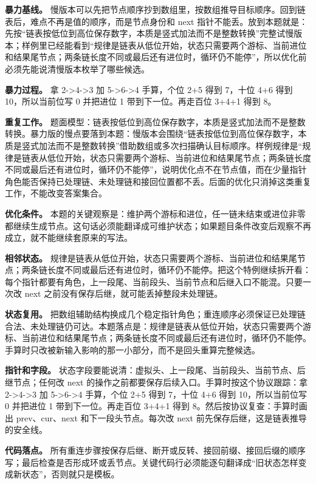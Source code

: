\textbf{暴力基线。} 慢版本可以先把节点顺序抄到数组里，按数组推导目标顺序。回到链表后，难点不再是值的顺序，而是节点身份和 next 指针不能丢。放到本题就是：先按“链表按低位到高位保存数字，本质是竖式加法而不是整数转换”完整试慢版本；样例里已经能看到“规律是链表从低位开始，状态只需要两个游标、当前进位和结果尾节点；两条链长度不同或最后还有进位时，循环仍不能停”，所以优化前必须先能说清慢版本枚举了哪些候选。

\textbf{暴力过程。} 拿 2->4->3 加 5->6->4 手算，个位 2+5 得到 7，十位 4+6 得到 10，所以当前位写 0 并把进位 1 带到下一位。再走百位 3+4+1 得到 8。

\textbf{重复工作。} 题面模型：链表按低位到高位保存数字，本质是竖式加法而不是整数转换。暴力版的慢点要落到本题：慢版本会围绕“链表按低位到高位保存数字，本质是竖式加法而不是整数转换”借助数组或多次扫描确认目标顺序。样例规律是“规律是链表从低位开始，状态只需要两个游标、当前进位和结果尾节点；两条链长度不同或最后还有进位时，循环仍不能停”，说明优化点不在节点值，而在少量指针角色能否保持已处理链、未处理链和接回位置都不丢。后面的优化只消掉这类重复工作，不能改变答案集合。

\textbf{优化条件。} 本题的关键观察是：维护两个游标和进位，任一链未结束或进位非零都继续生成节点。这句话必须能翻译成可维护状态；如果题目条件改变后观察不再成立，就不能继续套原来的写法。

\textbf{相邻状态。} 规律是链表从低位开始，状态只需要两个游标、当前进位和结果尾节点；两条链长度不同或最后还有进位时，循环仍不能停。把这个特例继续拆开看：每个指针都要有角色，上一段尾、当前段头、当前节点和后继入口不能混。只要一次改 next 之前没有保存后继，就可能丢掉整段未处理链。

\textbf{状态复用。} 把数组辅助结构换成几个稳定指针角色；重连顺序必须保证已处理链合法、未处理链仍可达。本题落点是：规律是链表从低位开始，状态只需要两个游标、当前进位和结果尾节点；两条链长度不同或最后还有进位时，循环仍不能停。手算时只改被新输入影响的那一小部分，而不是回头重算完整候选。

\textbf{指针和字段。} 状态字段要能说清：虚拟头、上一段尾、当前段头、当前节点、后继节点；任何改 next 的操作之前都要保存后续入口。手算时按这个协议跟踪：拿 2->4->3 加 5->6->4 手算，个位 2+5 得到 7，十位 4+6 得到 10，所以当前位写 0 并把进位 1 带到下一位。再走百位 3+4+1 得到 8。然后按协议复查：手算时画出 prev、cur、next 和下一段头节点。每次改 next 前先保存后继，这是链表推导的安全线。

\textbf{代码落点。} 所有重连步骤按保存后继、断开或反转、接回前缀、接回后缀的顺序写；最后检查是否形成环或丢节点。关键代码行必须能逐句翻译成“旧状态怎样变成新状态”，否则就只是模板。

